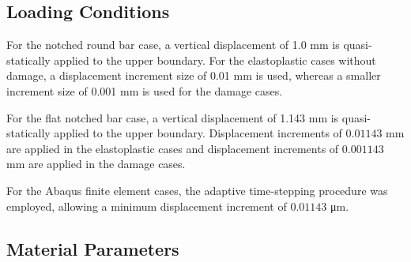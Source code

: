 \documentclass[sn-mathphys,Numbered,draft]{sn-jnl}%
\begin{document}
\subsection{Loading Conditions}

For the notched round bar case, a vertical displacement of 1.0 \si{\milli\meter} is quasi-statically applied to the upper boundary.
For the elastoplastic cases without damage, a displacement increment size of 0.01 \si{\milli\meter} is used, whereas a smaller increment size of 0.001 \si{\milli\meter} is used for the damage cases.


For the flat notched bar case, a vertical displacement of 1.143 \si{\milli\meter} is quasi-statically applied to the upper boundary.
Displacement increments of $0.01143$ \si{\milli\meter} are applied in the elastoplastic cases and displacement increments of $0.001143$ \si{\milli\meter} are applied in the damage cases.

For the Abaqus finite element cases, the adaptive time-stepping procedure was employed, allowing a minimum displacement increment of $0.01143$ \si{\micro\meter}.




\subsection{Material Parameters}
\end{document}
